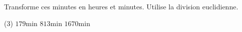 %
%
Transforme ces minutes en heures et minutes. Utilise la division euclidienne.

    \begin{tasks} (3)
        \task $179 \text{min}$
        \task $813 \text{min}$
        \task $1670 \text{min}$
    \end{tasks}
